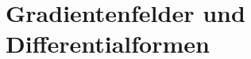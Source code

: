 \documentclass[../main.tex]{subfiles}
\begin{document}
\chapter{Gradientenfelder und Differentialformen}\label{chp:gradients}
\end{document}
